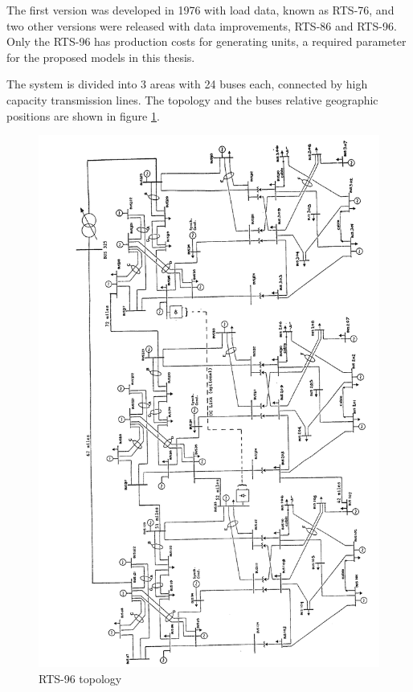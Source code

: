 \documentclass[12pt,LUDisStyle,twosided]{book}
\begin{document}
The first version was developed in 1976 with load data, known as RTS-76, and two other versions were released with data improvements, RTS-86 and RTS-96. Only the RTS-96 has production costs for generating units, a required parameter for the proposed models in this thesis.

The system is divided into 3 areas with 24 buses each, connected by high capacity transmission lines. The topology and the buses relative geographic positions are shown in figure \ref{fig:ieeetopology}.

\begin{figure} 
  \includegraphics[width=\textwidth,height=\textheight,keepaspectratio]{ieeetopology.png}
  \caption{RTS-96 topology \cite{wongieee}}
  \label{fig:ieeetopology}
\end{figure}
\end{document}
